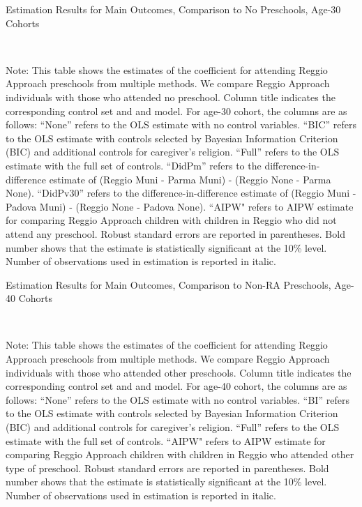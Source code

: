 \begin{table}[H] \caption{Estimation Results for Main Outcomes, Comparison to No Preschools, Age-30 Cohorts} \label{ols-M-adult30-reg-nopres}
\scalebox{0.65}{}
\vspace{1ex} \\
\footnotesize\raggedright{Note: This table shows the estimates of the coefficient for attending Reggio Approach preschools from multiple methods. We compare Reggio Approach individuals with those who attended no preschool. Column title indicates the corresponding control set and and model. For age-30 cohort, the columns are as follows: ``None'' refers to the OLS estimate with no control variables. ``BIC'' refers to the OLS estimate with controls selected by Bayesian Information Criterion (BIC) and additional controls for caregiver's religion. ``Full'' refers to the OLS estimate with the full set of controls. ``DidPm'' refers to the difference-in-difference estimate of (Reggio Muni - Parma Muni) - (Reggio None - Parma None). ``DidPv30'' refers to the difference-in-difference estimate of (Reggio Muni - Padova Muni) - (Reggio None - Padova None).  ``AIPW" refers to AIPW estimate for comparing Reggio Approach children with children in Reggio who did not attend any preschool. Robust standard errors are reported in parentheses. Bold number shows that the estimate is statistically significant at the 10\% level. Number of observations used in estimation is reported in italic.}
\end{table}





\begin{table}[H] \caption{Estimation Results for Main Outcomes, Comparison to Non-RA Preschools, Age-40 Cohorts} \label{ols-M-adult40-reg-pres}
\scalebox{0.65}{}
\vspace{1ex} \\
\footnotesize\raggedright{Note: This table shows the estimates of the coefficient for attending Reggio Approach preschools from multiple methods. We compare Reggio Approach individuals with those who attended other preschools.  Column title indicates the corresponding control set and and model. For age-40 cohort, the columns are as follows: ``None'' refers to the OLS estimate with no control variables. ``BI'' refers to the OLS estimate with controls selected by Bayesian Information Criterion (BIC) and additional controls for caregiver's religion. ``Full'' refers to the OLS estimate with the full set of controls.  ``AIPW" refers to AIPW estimate for comparing Reggio Approach children with children in Reggio who attended other type of preschool.  Robust standard errors are reported in parentheses. Bold number shows that the estimate is statistically significant at the 10\% level. Number of observations used in estimation is reported in italic.}
\end{table}

